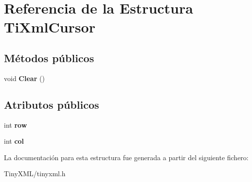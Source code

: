 \hypertarget{struct_ti_xml_cursor}{\section{Referencia de la Estructura Ti\-Xml\-Cursor}
\label{struct_ti_xml_cursor}
}
\subsection*{Métodos públicos}
\begin{DoxyCompactItemize}
\item 
\hypertarget{struct_ti_xml_cursor_a1e6fa622b59dafb71b6efe595105dcdd}{void {\bfseries Clear} ()}\label{struct_ti_xml_cursor_a1e6fa622b59dafb71b6efe595105dcdd}

\end{DoxyCompactItemize}
\subsection*{Atributos públicos}
\begin{DoxyCompactItemize}
\item 
\hypertarget{struct_ti_xml_cursor_a5b54dd949820c2db061e2be41f3effb3}{int {\bfseries row}}\label{struct_ti_xml_cursor_a5b54dd949820c2db061e2be41f3effb3}

\item 
\hypertarget{struct_ti_xml_cursor_a5694d7ed2c4d20109d350c14c417969d}{int {\bfseries col}}\label{struct_ti_xml_cursor_a5694d7ed2c4d20109d350c14c417969d}

\end{DoxyCompactItemize}


La documentación para esta estructura fue generada a partir del siguiente fichero\-:\begin{DoxyCompactItemize}
\item 
Tiny\-X\-M\-L/tinyxml.\-h\end{DoxyCompactItemize}
